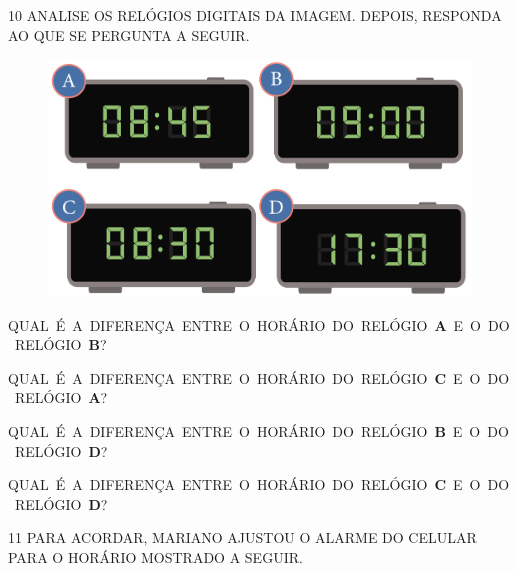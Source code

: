 \pagebreak
\num{10} ANALISE OS RELÓGIOS DIGITAIS DA IMAGEM. DEPOIS, RESPONDA AO QUE SE PERGUNTA A SEGUIR.


\begin{figure}[htpb!]
\centering
\includegraphics[width=.5\textwidth]{../ilustracoes/MAT1/SAEB_1ANO_MAT_FIGURA56.png}
\end{figure}

\begin{escolha}
\item\mbox{QUAL É A DIFERENÇA ENTRE O HORÁRIO DO RELÓGIO \textbf{A} E O DO RELÓGIO \textbf{B}?}


\item\mbox{QUAL É A DIFERENÇA ENTRE O HORÁRIO DO RELÓGIO \textbf{C} E O DO RELÓGIO \textbf{A}?}


\item\mbox{QUAL É A DIFERENÇA ENTRE O HORÁRIO DO RELÓGIO \textbf{B} E O DO RELÓGIO \textbf{D}?}


\item\mbox{QUAL É A DIFERENÇA ENTRE O HORÁRIO DO RELÓGIO \textbf{C} E O DO RELÓGIO \textbf{D}?}

\end{escolha}


\num{11} PARA ACORDAR, MARIANO AJUSTOU O ALARME DO CELULAR PARA O HORÁRIO MOSTRADO A SEGUIR.\bigskip

